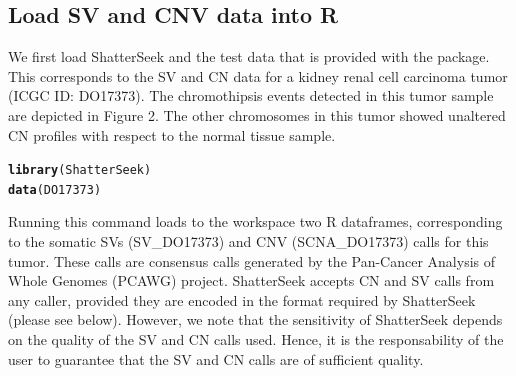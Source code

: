 \documentclass[twoside,a4wide,11pt]{article}\usepackage[]{graphicx}\usepackage[]{color}
\makeatletter
\newcommand{\hlstd}[1]{\textcolor[rgb]{0.345,0.345,0.345}{#1}}%
\newcommand{\hlkwd}[1]{\textcolor[rgb]{0.737,0.353,0.396}{\textbf{#1}}}%
\newenvironment{kframe}{%
 \def\at@end@of@kframe{}%
 \ifinner\ifhmode%
  \def\at@end@of@kframe{\end{minipage}}%
  \begin{minipage}{\columnwidth}%
 \fi\fi%
 \def\FrameCommand##1{\hskip\@totalleftmargin \hskip-\fboxsep
 \colorbox{shadecolor}{##1}\hskip-\fboxsep
     \hskip-\linewidth \hskip-\@totalleftmargin \hskip\columnwidth}%
 \MakeFramed {\advance\hsize-\width
   \@totalleftmargin\z@ \linewidth\hsize
   \@setminipage}}%
 {\par\unskip\endMakeFramed%
 \at@end@of@kframe}
\newenvironment{knitrout}{}{} %
\makeatother
\begin{document}

\subsection{Load SV and CNV data into R}


We first load ShatterSeek and the test data that is provided with the package.
This corresponds to the SV and CN data for a kidney renal cell carcinoma tumor (ICGC ID: DO17373).
The chromothipsis events detected in this tumor sample are depicted in Figure 2. The other
chromosomes in this tumor showed unaltered CN profiles with respect to the normal tissue sample.

\begin{knitrout}
\color{fgcolor}\begin{kframe}
\begin{alltt}
\hlkwd{library}\hlstd{(ShatterSeek)}
\hlkwd{data}\hlstd{(DO17373)}
\end{alltt}
\end{kframe}
\end{knitrout}
Running this command loads to the workspace two R dataframes, corresponding to the somatic SVs (SV\_DO17373)
and CNV (SCNA\_DO17373) calls for this tumor.
These calls are consensus calls generated by the Pan-Cancer Analysis of Whole Genomes (PCAWG) project.
ShatterSeek accepts CN and SV calls from any caller, 
provided they are encoded in the format required by ShatterSeek (please see below).
However, we note that the sensitivity of ShatterSeek depends on the quality of the SV and CN calls used.
Hence, it is the responsability of the user to guarantee that the SV and CN calls are of sufficient quality.
\end{document}
